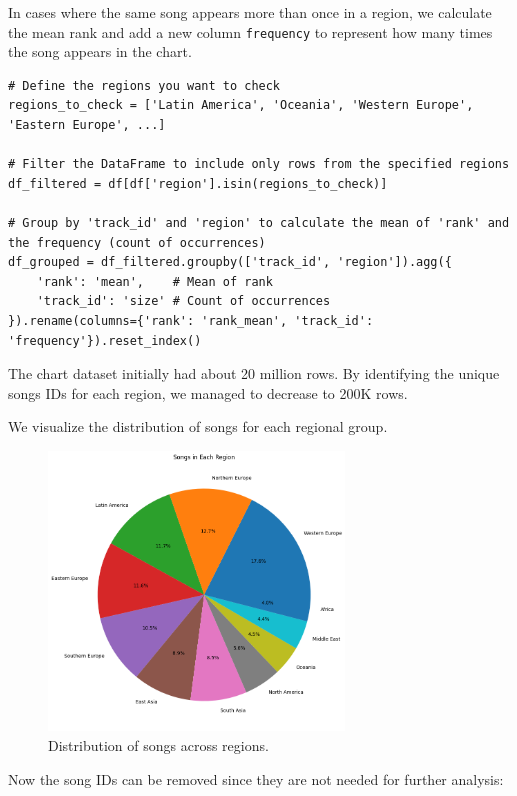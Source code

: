 In cases where the same song appears more than once in a region, we calculate the mean rank and add a new column \texttt{frequency} to represent how many times the song appears in the chart.

\begin{verbatim}
# Define the regions you want to check
regions_to_check = ['Latin America', 'Oceania', 'Western Europe', 'Eastern Europe', ...]
    
# Filter the DataFrame to include only rows from the specified regions
df_filtered = df[df['region'].isin(regions_to_check)]
    
# Group by 'track_id' and 'region' to calculate the mean of 'rank' and the frequency (count of occurrences)
df_grouped = df_filtered.groupby(['track_id', 'region']).agg({
    'rank': 'mean',    # Mean of rank 
    'track_id': 'size' # Count of occurrences 
}).rename(columns={'rank': 'rank_mean', 'track_id': 'frequency'}).reset_index()
\end{verbatim}

The chart dataset initially had about 20 million rows. By identifying the unique songs IDs for each region, we managed to decrease to 200K rows.

We visualize the distribution of songs for each regional group.


\begin{figure}[h]
    \centering
    \includegraphics[width=0.7\textwidth]{media/region_songs.png} 
    \caption{Distribution of songs across regions.}
    \label{pie_chart}
\end{figure}


Now the song IDs can be removed since they are not needed for further analysis:

